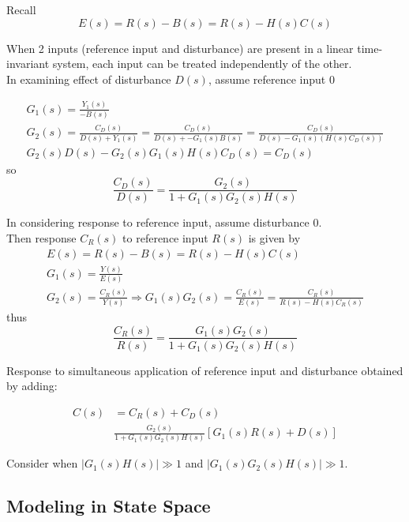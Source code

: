 \documentclass[10pt]{amsart}
\begin{document}
\begin{multicols*}{2}
Recall
\[
E(s) = R(s) - B(s) = R(s) - H(s)C(s)
\]

When 2 inputs (reference input and disturbance) are present in a linear time-invariant system, each input can be treated independently of the other. \\

In examining effect of disturbance $D(s)$, assume reference input $0$

\[
\begin{gathered}
G_1(s) = \frac{Y_1(s) }{ -B(s) } \\
G_2(s) = \frac{ C_D(s)}{ D(s) + Y_1(s)} = \frac{C_D(s) }{ D(s) +  - G_1(s)B(s) } = \frac{C_D(s)}{ D(s) - G_1(s)(H(s) C_D(s) ) } \\
G_2(s) D(s) - G_2(s) G_1(s) H(s) C_D(s) = C_D(s) 
\end{gathered}
\]
so
\begin{equation}
\frac{C_D(s)}{ D(s) } = \frac{G_2(s) }{ 1 + G_1(s) G_2(s) H(s) } 
\end{equation}

In considering response to reference input, assume disturbance $0$. \\
Then response $C_R(s)$ to reference input $R(s)$ is given by
\[
\begin{gathered}
	E(s) = R(s) - B(s) = R(s) - H(s) C(s) \\
G_1(s) = \frac{Y(s)}{E(s)} \\
G_2(s) = \frac{C_R(s)}{Y(s) } \Longrightarrow G_1(s) G_2(s) = \frac{C_R(s) }{ E(s) } = \frac{C_R(s)}{R(s) - H(s) C_R(s) }
\end{gathered}
\]
thus
\begin{equation}
\frac{C_R(s)}{R(s)} = \frac{G_1(s) G_2(s)}{ 1 + G_1(s) G_2(s) H(s) }
\end{equation}

Response to simultaneous application of reference input and disturbance obtained by adding:

\begin{equation}
\begin{aligned}
C(s) & = C_R(s) + C_D(s) \\
& \frac{G_2(s) }{ 1 + G_1(s) G_2(s) H(s) } \left[ G_1(s) R(s) + D(s) \right]
\end{aligned}
\end{equation}

Consider when $|G_1(s)H(s) | \gg 1$ and $|G_1(s) G_2(s) H(s) | \gg 1$.

\subsection{Modeling in State Space}


\end{multicols*}
\end{document}
